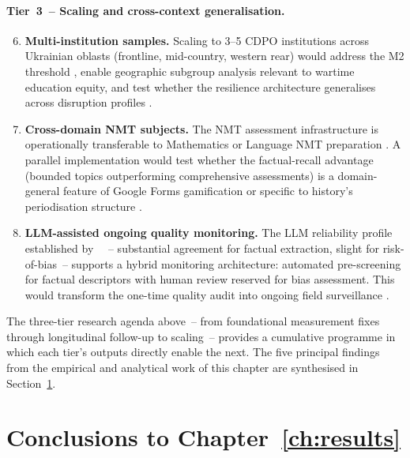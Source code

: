 \paragraph{Tier~3~-- Scaling and cross-context generalisation.}

\begin{enumerate}
\setcounter{enumi}{5}

\item \textbf{Multi-institution samples.}
Scaling to 3--5 CDPO institutions across Ukrainian oblasts (frontline, mid-country, western rear) would address the M2 threshold \cite{Borenstein2009}, enable geographic subgroup analysis relevant to wartime education equity, and test whether the resilience architecture generalises across disruption profiles \cite{UNESCO2023, Striuk_2022}.

\item \textbf{Cross-domain NMT subjects.}
The NMT assessment infrastructure is operationally transferable to Mathematics or Language NMT preparation \cite{Korniienko2025aredu}. A parallel implementation would test whether the factual-recall advantage (bounded topics outperforming comprehensive
assessments) is a domain-general feature of Google Forms gamification or
specific to history's periodisation structure \cite{Wright-Maley2018, Qian2016}.

\item \textbf{LLM-assisted ongoing quality monitoring.}
The LLM reliability profile established by \citeauthor{Korniienko2025mrqs}~\cite{Korniienko2025mrqs}~-- substantial agreement for factual extraction, slight for risk-of-bias~-- supports a hybrid monitoring architecture: automated pre-screening for factual descriptors with human review reserved for bias assessment. This would transform the one-time quality audit into ongoing field surveillance \cite{TamimMMRQG2021}.

\end{enumerate}

The three-tier research agenda above~-- from foundational measurement fixes through
longitudinal follow-up to scaling~-- provides a cumulative programme in which each
tier's outputs directly enable the next.
The five principal findings from the empirical and analytical work of this chapter
are synthesised in Section~\ref{sec:ch3-conclusions}.

\section{Conclusions to Chapter~\ref{ch:results}} \label{sec:ch3-conclusions}

